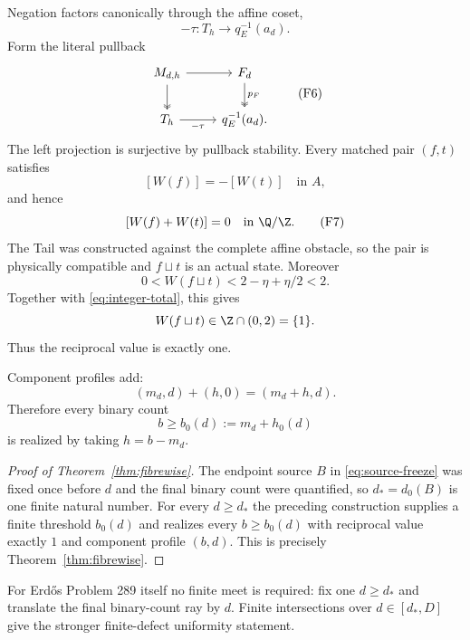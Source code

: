 Negation factors canonically through the affine coset,
\[
-\tau:T_h\to q_E^{-1}(a_d).
\]
Form the literal pullback
\[
\begin{tikzcd}
M_{d,h} \arrow[r] \arrow[d,two heads]
& F_d \arrow[d,two heads,"p_F"]\\
T_h \arrow[r,"-\tau"']
& q_E^{-1}(a_d).
\end{tikzcd}
\tag{F6}\label{eq:coset-cancellation-pb}
\]
The left projection is surjective by pullback stability.  Every matched pair
$(f,t)$ satisfies
\[
[W(f)]=-[W(t)]\quad\text{in }A,
\]
and hence
\[
[W(f)+W(t)]=0\quad\text{in }\Q/\Z.
\tag{F7}\label{eq:integer-total}
\]
The Tail was constructed against the complete affine obstacle, so the pair is
physically compatible and $f\sqcup t$ is an actual state.  Moreover
\[
0<W(f\sqcup t)
<2-\eta+\eta/2
<2.
\]
Together with \eqref{eq:integer-total}, this gives
\[
W(f\sqcup t)\in\Z\cap(0,2)=\{1\}.
\]
Thus the reciprocal value is exactly one.

Component profiles add:
\[
(m_d,d)+(h,0)=(m_d+h,d).
\tag{F8}\label{eq:profile-addition-root}
\]
Therefore every binary count
\[
b\ge b_0(d):=m_d+h_0(d)
\]
is realized by taking $h=b-m_d$.

\begin{proof}[Proof of Theorem~\ref{thm:fibrewise}]
The endpoint source $B$ in \eqref{eq:source-freeze} was fixed once before $d$
and the final binary count were quantified, so $d_*=d_0(B)$ is one finite
natural number.  For every $d\ge d_*$ the preceding construction supplies a
finite threshold $b_0(d)$ and realizes every $b\ge b_0(d)$ with reciprocal
value exactly $1$ and component profile $(b,d)$.  This is precisely
Theorem~\ref{thm:fibrewise}.
\end{proof}

For Erdős Problem 289 itself no finite meet is required: fix one $d\ge d_*$
and translate the final binary-count ray by $d$.  Finite intersections over
$d\in[d_*,D]$ give the stronger finite-defect uniformity statement.
